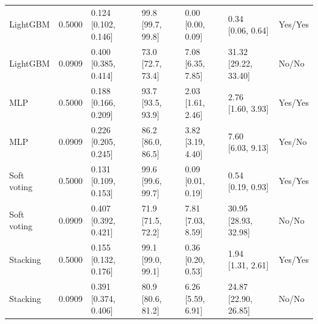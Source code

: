 \begin{table}[htbp]
{\begin{tabular}{lllllll}
LightGBM & 0.5000 & \shortstack{{0.124} \\ {[0.102, 0.146]}} & \shortstack{{99.8} \\ {[99.7, 99.8]}} & \shortstack{{0.00} \\ {[0.00, 0.09]}} & \shortstack{{0.34} \\ {[0.06, 0.64]}} & Yes/Yes \\
LightGBM & 0.0909 & \shortstack{{0.400} \\ {[0.385, 0.414]}} & \shortstack{{73.0} \\ {[72.7, 73.4]}} & \shortstack{{7.08} \\ {[6.35, 7.85]}} & \shortstack{{31.32} \\ {[29.22, 33.40]}} & No/No \\
MLP & 0.5000 & \shortstack{{0.188} \\ {[0.166, 0.209]}} & \shortstack{{93.7} \\ {[93.5, 93.9]}} & \shortstack{{2.03} \\ {[1.61, 2.46]}} & \shortstack{{2.76} \\ {[1.60, 3.93]}} & Yes/Yes \\
MLP & 0.0909 & \shortstack{{0.226} \\ {[0.205, 0.245]}} & \shortstack{{86.2} \\ {[86.0, 86.5]}} & \shortstack{{3.82} \\ {[3.19, 4.40]}} & \shortstack{{7.60} \\ {[6.03, 9.13]}} & Yes/No \\
Soft voting & 0.5000 & \shortstack{{0.131} \\ {[0.109, 0.153]}} & \shortstack{{99.6} \\ {[99.6, 99.7]}} & \shortstack{{0.09} \\ {[0.01, 0.19]}} & \shortstack{{0.54} \\ {[0.19, 0.93]}} & Yes/Yes \\
Soft voting & 0.0909 & \shortstack{{0.407} \\ {[0.392, 0.421]}} & \shortstack{{71.9} \\ {[71.5, 72.2]}} & \shortstack{{7.81} \\ {[7.03, 8.59]}} & \shortstack{{30.95} \\ {[28.93, 32.98]}} & No/No \\
Stacking & 0.5000 & \shortstack{{0.155} \\ {[0.132, 0.176]}} & \shortstack{{99.1} \\ {[99.0, 99.1]}} & \shortstack{{0.36} \\ {[0.20, 0.53]}} & \shortstack{{1.94} \\ {[1.31, 2.61]}} & Yes/Yes \\
Stacking & 0.0909 & \shortstack{{0.391} \\ {[0.374, 0.406]}} & \shortstack{{80.9} \\ {[80.6, 81.2]}} & \shortstack{{6.26} \\ {[5.59, 6.91]}} & \shortstack{{24.87} \\ {[22.90, 26.85]}} & No/No \\
\bottomrule
\end{tabular}
}
\end{table}
